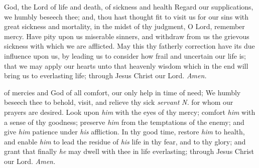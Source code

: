 
 God, the Lord of life and death, of sickness and health Regard our supplications, we humbly beseech thee; and, thou hast thought fit to visit us for our sins with great sickness and mortality, in the midst of thy judgment, O Lord, remember mercy. Have pity upon us miserable sinners, and withdraw from us the grievous sickness with which we are afflicted. May this thy fatherly correction have its due influence upon us, by leading us to consider how frail and uncertain our life is; that we may apply our hearts unto that heavenly wisdom which in the end will bring us to everlasting life; through Jesus Christ our Lord. \textit{Amen.}

 of mercies and God of all comfort, our only help in time of need; We humbly beseech thee to behold, visit, and relieve thy sick \textit{servant} \textit{N.} for whom our prayers are desired. Look upon \textit{him} with the eyes of thy mercy; comfort \textit{him} with a sense of thy goodness; preserve \textit{him} from the temptations of the enemy; and give \textit{him} patience under \textit{his} affliction. In thy good time, restore \textit{him} to health, and enable \textit{him} to lead the residue of \textit{his} life in thy fear, and to thy glory; and grant that finally \textit{he} may dwell with thee in life everlasting; through Jesus Christ our Lord. \textit{Amen.}



